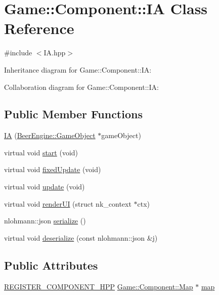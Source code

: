 \hypertarget{class_game_1_1_component_1_1_i_a}{}\section{Game\+:\+:Component\+:\+:IA Class Reference}
\label{class_game_1_1_component_1_1_i_a}


{\ttfamily \#include $<$I\+A.\+hpp$>$}



Inheritance diagram for Game\+:\+:Component\+:\+:IA\+:


Collaboration diagram for Game\+:\+:Component\+:\+:IA\+:
\subsection*{Public Member Functions}
\begin{DoxyCompactItemize}
\item 
\mbox{\hyperlink{class_game_1_1_component_1_1_i_a_a0193b2ba07bc5bcabe9278a6dcd592bc}{IA}} (\mbox{\hyperlink{class_beer_engine_1_1_game_object}{Beer\+Engine\+::\+Game\+Object}} $\ast$game\+Object)
\item 
virtual void \mbox{\hyperlink{class_game_1_1_component_1_1_i_a_ab440dc76a8837e291f6545e0dd15c819}{start}} (void)
\item 
virtual void \mbox{\hyperlink{class_game_1_1_component_1_1_i_a_a72b1e3aaf4686e0abef2e147d48f50e9}{fixed\+Update}} (void)
\item 
virtual void \mbox{\hyperlink{class_game_1_1_component_1_1_i_a_a5890e0da2fb55d58868c0cd441c33dc4}{update}} (void)
\item 
virtual void \mbox{\hyperlink{class_game_1_1_component_1_1_i_a_a50991daa660054341c1f339611226c02}{render\+UI}} (struct nk\+\_\+context $\ast$ctx)
\item 
nlohmann\+::json \mbox{\hyperlink{class_game_1_1_component_1_1_i_a_a3d5af6c25e457a246fac8cbd63764223}{serialize}} ()
\item 
virtual void \mbox{\hyperlink{class_game_1_1_component_1_1_i_a_a81f34676232065d85961d84be1268e6f}{deserialize}} (const nlohmann\+::json \&j)
\end{DoxyCompactItemize}
\subsection*{Public Attributes}
\begin{DoxyCompactItemize}
\item 
\mbox{\hyperlink{_core_8hpp_a895cfc16b36b6c309f80b98ded63df4f}{R\+E\+G\+I\+S\+T\+E\+R\+\_\+\+C\+O\+M\+P\+O\+N\+E\+N\+T\+\_\+\+H\+PP}} \mbox{\hyperlink{class_game_1_1_component_1_1_map}{Game\+::\+Component\+::\+Map}} $\ast$ \mbox{\hyperlink{class_game_1_1_component_1_1_i_a_a2ae49ef7e89503294de091af505fce74}{map}}
\end{DoxyCompactItemize}
